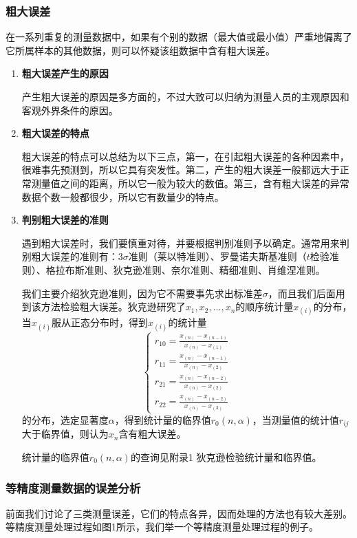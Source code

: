 \subsubsection{粗大误差}
在一系列重复的测量数据中，如果有个别的数据（最大值或最小值）严重地偏离了它所属样本的其他数据，则可以怀疑该组数据中含有粗大误差。
\begin{enumerate}
	\item \textbf{粗大误差产生的原因}
	
	\qquad 产生粗大误差的原因是多方面的，不过大致可以归纳为测量人员的主观原因和客观外界条件的原因。
	\item \textbf{粗大误差的特点}
	
	\qquad 粗大误差的特点可以总结为以下三点，第一，在引起粗大误差的各种因素中，很难事先预测到，所以它具有突发性。第二，产生的粗大误差一般都远大于正常测量值之间的距离，所以它一般为较大的数值。第三，含有粗大误差的异常数据个数一般都很少，所以它有数量少的特点。
	\item \textbf{判别粗大误差的准则}
	
	\qquad 遇到粗大误差时，我们要慎重对待，并要根据判别准则予以确定。通常用来判别粗大误差的准则有：$ 3\sigma $准则（莱以特准则）、罗曼诺夫斯基准则（$ t $检验准则）、格拉布斯准则、狄克逊准则、奈尔准则、精细准则、肖维涅准则。
	
	\qquad 我们主要介绍狄克逊准则，因为它不需要事先求出标准差$ \sigma $，而且我们后面用到该方法检验粗大误差。狄克逊研究了$ x_1,x_2,...,x_n $的顺序统计量$ x_{(i)} $的分布，当$ x_{(i)} $服从正态分布时，得到$ x_{(i)} $的统计量
	\[ \begin{cases}
		r_{10}=\frac{x_{(n)}-x_{(n-1)}}{x_{(n)}-x_{(1)}}\\
		r_{11}=\frac{x_{(n)}-x_{(n-1)}}{x_{(n)}-x_{(2)}}\\
		r_{21}=\frac{x_{(n)}-x_{(n-2)}}{x_{(n)}-x_{(2)}}\\
		r_{22}=\frac{x_{(n)}-x_{(n-2)}}{x_{(n)}-x_{(3)}}
	\end{cases} \]
	的分布，选定显著度$ \alpha $，得到统计量的临界值$ r_0(n,\alpha) $，当测量值的统计值$ r_{ij} $大于临界值，则认为$ x_n $含有粗大误差。
	
	\qquad 统计量的临界值$ r_0(n,\alpha) $的查询见附录1 狄克逊检验统计量和临界值。
\end{enumerate}

\subsubsection{等精度测量数据的误差分析}
前面我们讨论了三类测量误差，它们的特点各异，因而处理的方法也有较大差别。等精度测量处理过程如图1所示，我们举一个等精度测量处理过程的例子。
